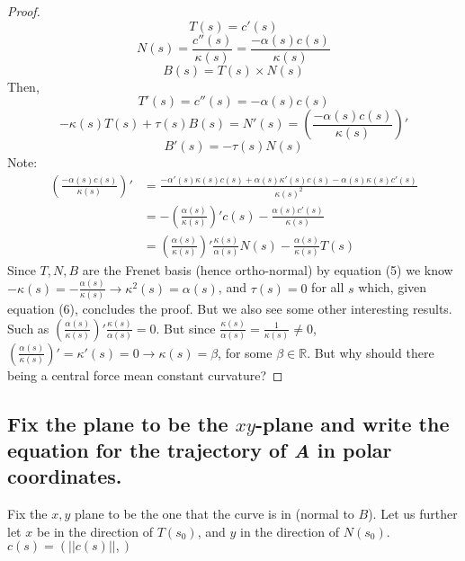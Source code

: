 \documentclass[12pt]{amsart}
\begin{document}
\begin{proof}
\begin{equation}
	T(s)=c'(s)
\end{equation}
\begin{equation}
	N(s)=\frac{c''(s)}{\kappa(s)}=\frac{-\alpha(s)c(s)}{\kappa(s)}
\end{equation}
\begin{equation}
	B(s)=T(s)\times N(s)
\end{equation}
Then,
\begin{equation}
	T'(s)=c''(s)=-\alpha(s)c(s)
\end{equation}
\begin{equation}
	-\kappa(s)T(s)+\tau(s)B(s)=N'(s)=\left(\frac{-\alpha(s)c(s)}{\kappa(s)}\right)'
\end{equation}
\begin{equation}
	B'(s)=-\tau(s)N(s)
\end{equation}
Note: 
\begin{align*}
	\left(\frac{-\alpha(s)c(s)}{\kappa(s)}\right)'&=\frac{-\alpha'(s)\kappa(s)c(s)+\alpha(s)\kappa'(s)c(s)-\alpha(s)\kappa(s)c'(s)}{\kappa(s)^2}
	\\&=-\left(\frac{\alpha(s)}{\kappa(s)}\right)'c(s)-\frac{\alpha(s)c'(s)}{\kappa(s)}
	\\&=\left(\frac{\alpha(s)}{\kappa(s)}\right)'\frac{\kappa(s)}{\alpha(s)}N(s)-\frac{\alpha(s)}{\kappa(s)}T(s)
\end{align*}
Since $T,N,B$ are the Frenet basis (hence ortho-normal) by equation (5) we know $-\kappa(s)=-\frac{\alpha(s)}{\kappa(s)}\rightarrow \kappa^2(s)=\alpha(s)$, and $\tau(s)=0$ for all $s$ which, given equation (6), concludes the proof. But we also see some other interesting results. Such as $\left(\frac{\alpha(s)}{\kappa(s)}\right)'\frac{\kappa(s)}{\alpha(s)}=0$. But since $\frac{\kappa(s)}{\alpha(s)}=\frac{1}{\kappa(s)}\neq0$, $\left(\frac{\alpha(s)}{\kappa(s)}\right)'=\kappa'(s)=0\rightarrow\kappa(s)=\beta$, for some $\beta\in\mathbb{R}$. But why should there being a central force mean constant curvature?
\end{proof}

\subsection{Fix the plane to be the $xy$-plane and write the equation for the trajectory of \emph{A} in polar coordinates.}
Fix the $x,y$ plane to be the one that the curve is in (normal to $B$). Let us further let $x$ be in the direction of $T(s_0)$, and $y$ in the direction of $N(s_0)$. $c(s)=(||c(s)||, )$
\end{document}
